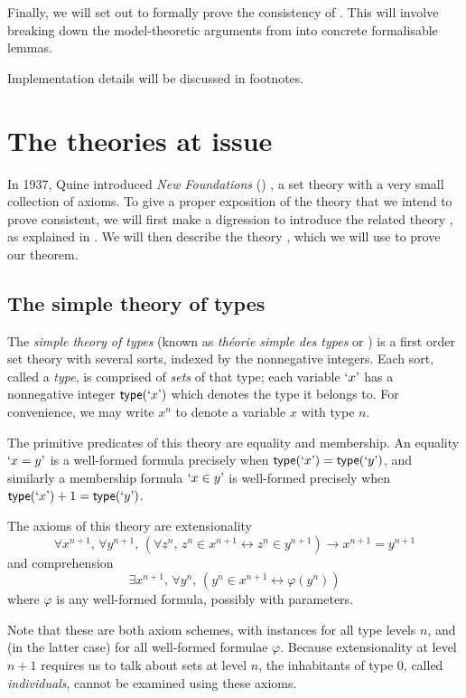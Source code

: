 Finally, we will set out to formally prove the consistency of \NF.
This will involve breaking down the model-theoretic arguments from \cite{typical-ambiguity,holmes-ttt} into concrete formalisable lemmas.

Implementation details will be discussed in footnotes.

\section{The theories at issue}
\label{s:theories}

In 1937, Quine introduced \emph{New Foundations} (\NF) \cite{quine-nf}, a set theory with a very small collection of axioms.
To give a proper exposition of the theory that we intend to prove consistent, we will first make a digression to introduce the related theory {\TST}, as explained in \cite{con-nf}.
We will then describe the theory {\TTT}, which we will use to prove our theorem.

\subsection{The simple theory of types}

The \emph{simple theory of types} (known as \emph{théorie simple des types} or {\TST}) is a first order set theory with several sorts, indexed by the nonnegative integers.
Each sort, called a \emph{type}, is comprised of \emph{sets} of that type; each variable \( \mquote{x} \) has a nonnegative integer \( \ttype(\mquote x) \) which denotes the type it belongs to.
For convenience, we may write \( x^n \) to denote a variable \( x \) with type \( n \).

The primitive predicates of this theory are equality and membership.
An equality \( \mquote{x = y} \) is a well-formed formula precisely when \( \ttype(\mquote{x}) = \ttype(\mquote{y}) \), and similarly a membership formula \( \mquote{x \in y} \) is well-formed precisely when \( \ttype(\mquote{x}) + 1 = \ttype(\mquote{y}) \).

The axioms of this theory are extensionality
\[ \forall x^{n + 1},\, \forall y^{n + 1},\, (\forall z^n,\, z^n \in x^{n+1} \leftrightarrow z^n \in y^{n+1}) \to x^{n+1} = y^{n+1} \]
and comprehension
\[ \exists x^{n + 1},\, \forall y^n,\, (y^n \in x^{n+1} \leftrightarrow \varphi(y^n)) \]
where \( \varphi \) is any well-formed formula, possibly with parameters.

Note that these are both axiom schemes, with instances for all type levels \( n \), and (in the latter case) for all well-formed formulae \( \varphi \).
Because extensionality at level \( n + 1 \) requires us to talk about sets at level \( n \), the inhabitants of type 0, called \emph{individuals}, cannot be examined using these axioms.

